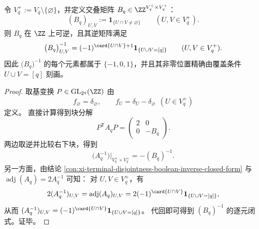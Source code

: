 \begin{proposition}\label{prop:xi-disjointness-boolean-overlap-matrix-inverse}
令 \(V_q^+:=V_q\setminus\{\varnothing\}\)，并定义交叠矩阵 \(B_q\in \ZZ^{V_q^+\times V_q^+}\)：
\[
(B_q)_{U,V}:=\mathbf 1_{\{U\cap V\neq\varnothing\}}\qquad(U,V\in V_q^+).
\]
则 \(B_q\) 在 \(\ZZ\) 上可逆，且其逆矩阵满足
\[
\bigl(B_q\bigr)^{-1}_{U,V}
=(-1)^{\card{U\cap V}+1}\mathbf 1_{\{U\cup V=[q]\}}
\qquad (U,V\in V_q^+).
\]
因此 \(\bigl(B_q\bigr)^{-1}\) 的每个元素都属于 \(\{-1,0,1\}\)，并且其非零位置精确由覆盖条件 \(U\cup V=[q]\) 刻画。
\end{proposition}

\begin{proof}
取基变换 \(P\in\mathrm{GL}_{2^q}(\ZZ)\) 由
\[
f_{\varnothing}=\delta_{\varnothing},\qquad
f_U=\delta_U-\delta_{\varnothing}\ \ (U\in V_q^+)
\]
定义。
直接计算得到块分解
\[
P^{\mathsf T}A_qP=\begin{pmatrix}2&0\\[2pt]0&-B_q\end{pmatrix}.
\]
两边取逆并比较右下块，得到
\[
\bigl(A_q^{-1}\bigr)\big|_{V_q^+\times V_q^+}=-(B_q)^{-1}.
\]
另一方面，由结论 \ref{con:xi-terminal-disjointness-boolean-inverse-closed-form} 与 \(\operatorname{adj}(A_q)=2A_q^{-1}\) 可知：
对 \(U,V\in V_q^+\)，有
\[
2(A_q^{-1})_{U,V}
=\operatorname{adj}(A_q)_{U,V}
=2(-1)^{\card{U\cap V}}\mathbf 1_{\{U\cup V=[q]\}},
\]
从而 \((A_q^{-1})_{U,V}=(-1)^{\card{U\cap V}}\mathbf 1_{\{U\cup V=[q]\}}\)。
代回即可得到 \((B_q)^{-1}\) 的逐元闭式。证毕。
\end{proof}

\endinput

